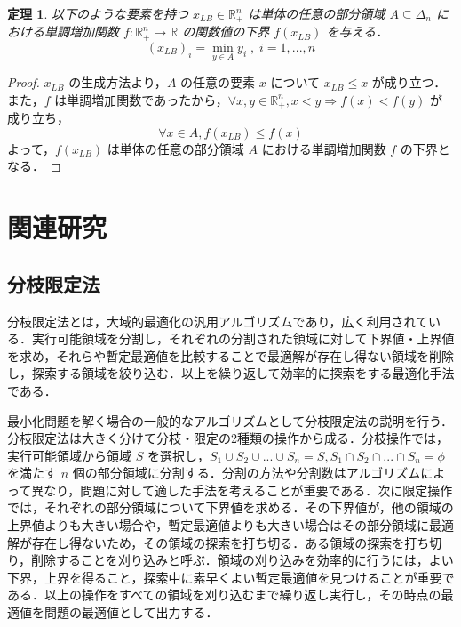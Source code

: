 \documentclass[a4paper,11pt]{jreport}
\newtheorem{theorem}{定理}
\begin{document}
\begin{theorem}\label{lower_bound_of_monotonic_function}
以下のような要素を持つ $ x_{LB} \in \mathbb{R}^n_{+} $ は単体の任意の部分領域 $ A \subseteq \Delta_n $ における単調増加関数 $ f :  \mathbb{R}^n_{+} \to \mathbb{R} $ の関数値の下界 $ f(x_{LB}) $ を与える．
$$ (x_{LB})_i = \min_{y \in A } y_i \; , \; i = 1, ..., n $$
\end{theorem}

\begin{proof}
$ x_{LB} $ の生成方法より，$ A $ の任意の要素 $ x $ について $ x_{LB} \leq x $ が成り立つ．\\
また，$ f $ は単調増加関数であったから，$ \forall x, y \in \mathbb{R}^n_{+}, x < y \Rightarrow f(x) < f(y) $ が成り立ち，
$$ \forall x \in A, f(x_{LB}) \leq f(x) $$
よって，$ f(x_{LB}) $ は単体の任意の部分領域 $ A $ における単調増加関数 $ f $ の下界となる．
\end{proof}

\chapter{関連研究}

\section{分枝限定法}

分枝限定法とは，大域的最適化の汎用アルゴリズムであり，広く利用されている．実行可能領域を分割し，それぞれの分割された領域に対して下界値・上界値を求め，それらや暫定最適値を比較することで最適解が存在し得ない領域を削除し，探索する領域を絞り込む．以上を繰り返して効率的に探索をする最適化手法である．\par
最小化問題を解く場合の一般的なアルゴリズムとして分枝限定法の説明を行う．分枝限定法は大きく分けて分枝・限定の2種類の操作から成る．分枝操作では，実行可能領域から領域 $ S $ を選択し，$ S_1 \cup S_2 \cup ... \cup S_n = S, S_1 \cap S_2 \cap ... \cap S_n = \phi $ を満たす $ n $ 個の部分領域に分割する．分割の方法や分割数はアルゴリズムによって異なり，問題に対して適した手法を考えることが重要である．次に限定操作では，それぞれの部分領域について下界値を求める．その下界値が，他の領域の上界値よりも大きい場合や，暫定最適値よりも大きい場合はその部分領域に最適解が存在し得ないため，その領域の探索を打ち切る．ある領域の探索を打ち切り，削除することを刈り込みと呼ぶ．領域の刈り込みを効率的に行うには，よい下界，上界を得ること，探索中に素早くよい暫定最適値を見つけることが重要である．以上の操作をすべての領域を刈り込むまで繰り返し実行し，その時点の最適値を問題の最適値として出力する．\par
\end{document}
